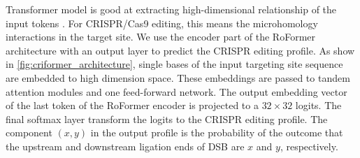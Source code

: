 \documentclass{article}
\begin{document}
Transformer model is good at extracting high-dimensional relationship of the input tokens \cite{su2024roformer}. For CRISPR/Cas9 editing, this means the microhomology interactions in the target site. We use the encoder part of the RoFormer architecture with an output layer to predict the CRISPR editing profile\cite{su2024roformer}. As show in \cref{fig:criformer_architecture}, single bases of the input targeting site sequence are embedded to high dimension space. These embeddings are passed to tandem attention modules and one feed-forward network. The output embedding vector of the last token of the RoFormer encoder is projected to a $32\times 32$ logits. The final softmax layer transform the logits to the CRISPR editing profile. The component $(x,y)$ in the output profile is the probability of the outcome that the upstream and downstream ligation ends of DSB are $x$ and $y$, respectively.
\end{document}
